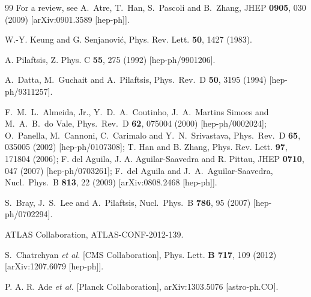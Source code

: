 \documentclass[reprint,prl,twocolumn,superscriptaddress,showpacs,nofootinbib,floatfix,preprintnumbers]{revtex4-1}
\begin{document}
\begin{thebibliography}{99}
  For a review, see A.~Atre, T.~Han, S.~Pascoli and B.~Zhang,
  JHEP {\bf 0905}, 030 (2009) [arXiv:0901.3589 [hep-ph]].

 W.-Y. Keung and G. Senjanovi\'{c}, Phys. Rev. Lett. {\bf
  50}, 1427 (1983). 


 A. Pilaftsis, Z. Phys. C {\bf 55}, 275 (1992) [hep-ph/9901206].

 A.~Datta, M.~Guchait and A.~Pilaftsis,
  Phys.\ Rev.\ D {\bf 50}, 3195 (1994) [hep-ph/9311257]. 

    F.~M.~L.~Almeida,    Jr.,    Y.~D.~A.~Coutinho,
  J.~A.~Martins Simoes and M.~A.~B.~do Vale,
  Phys.\ Rev.\ D {\bf 62}, 075004 (2000) [hep-ph/0002024]; 
 O.~Panella, M.~Cannoni, C.~Carimalo and Y.~N.~Srivastava,
  Phys.\ Rev.\ D {\bf 65}, 035005 (2002) [hep-ph/0107308];  
T. Han and B. Zhang, Phys. Rev. Lett. {\bf 97}, 171804 (2006); %
F. del Aguila, J. A. Aguilar-Saavedra and R. Pittau, JHEP {\bf 0710},
047 (2007) [hep-ph/0703261];  
F.~del Aguila and J.~A.~Aguilar-Saavedra,
  Nucl.\ Phys.\ B {\bf 813}, 22 (2009) [arXiv:0808.2468 [hep-ph]].

 S.~Bray, J.~S.~Lee and A.~Pilaftsis,
  Nucl.\ Phys.\ B {\bf 786}, 95 (2007) [hep-ph/0702294].

 ATLAS Collaboration, ATLAS-CONF-2012-139.  

 S.~Chatrchyan {\it et al.}  [CMS Collaboration], 
Phys. Lett. {\bf B 717}, 109
  (2012) [arXiv:1207.6079 [hep-ph]].  


 P. A. R. Ade {\it et al.} [Planck Collaboration],
  arXiv:1303.5076 [astro-ph.CO].  




\end{thebibliography}
\end{document}
